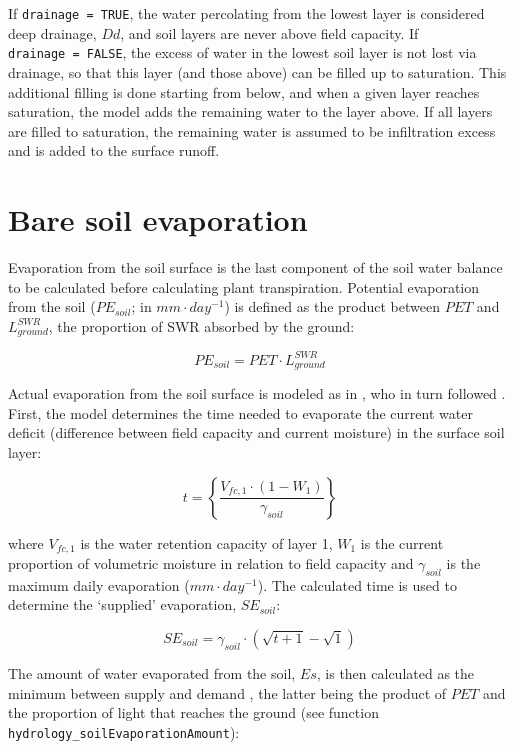 \documentclass[]{book}
\begin{document}
If \texttt{drainage\ =\ TRUE}, the water percolating from the lowest
layer is considered deep drainage, \(Dd\), and soil layers are never
above field capacity. If \texttt{drainage\ =\ FALSE}, the excess of
water in the lowest soil layer is not lost via drainage, so that this
layer (and those above) can be filled up to saturation. This additional
filling is done starting from below, and when a given layer reaches
saturation, the model adds the remaining water to the layer above. If
all layers are filled to saturation, the remaining water is assumed to
be infiltration excess and is added to the surface runoff.

\section{Bare soil evaporation}\label{soilevaporation}

Evaporation from the soil surface is the last component of the soil
water balance to be calculated before calculating plant transpiration.
Potential evaporation from the soil (\(PE_{soil}\); in
\(mm \cdot day^{-1}\)) is defined as the product between \(PET\) and
\(L^{SWR}_{ground}\), the proportion of SWR absorbed by the ground:

\begin{equation}
PE_{soil} =  PET \cdot L^{SWR}_{ground}
\end{equation}

Actual evaporation from the soil surface is modeled as in
\citet{Mouillot2001}, who in turn followed \citet{Ritchie1972}. First,
the model determines the time needed to evaporate the current water
deficit (difference between field capacity and current moisture) in the
surface soil layer:

\begin{equation}
t = \left \{ \frac{V_{fc,1}\cdot(1- W_1)}{\gamma_{soil}} \right \}
\end{equation}

where \(V_{fc,1}\) is the water retention capacity of layer 1, \(W_1\)
is the current proportion of volumetric moisture in relation to field
capacity and \(\gamma_{soil}\) is the maximum daily evaporation
(\(mm \cdot day^{-1}\)). The calculated time is used to determine the
`supplied' evaporation, \(SE_{soil}\):

\begin{equation}
SE_{soil} = \gamma_{soil} \cdot (\sqrt{t+1}-\sqrt{1})
\end{equation}

The amount of water evaporated from the soil, \(Es\), is then calculated
as the minimum between supply and demand \citep{Federer1982}, the latter
being the product of \(PET\) and the proportion of light that reaches
the ground (see function \texttt{hydrology\_soilEvaporationAmount}):
\end{document}
